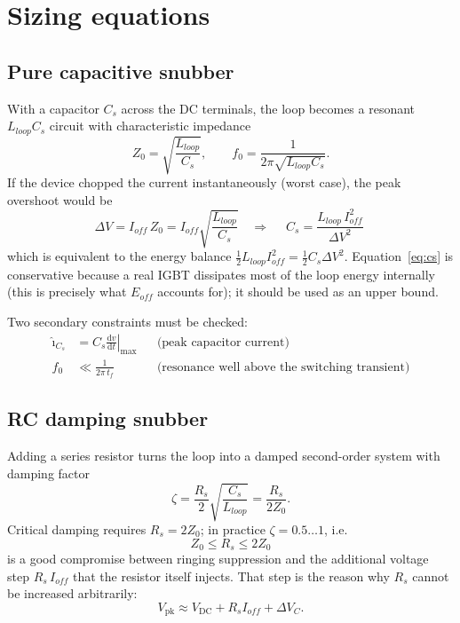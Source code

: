 \documentclass[11pt,a4paper]{article}
\newcommand{\Vdc}{V_{\mathrm{DC}}}
\newcommand{\Vpk}{V_{\mathrm{pk}}}
\begin{document}
\section{Sizing equations}

\subsection{Pure capacitive snubber}

With a capacitor $C_s$ across the DC terminals, the loop becomes a resonant
$L_{loop}C_s$ circuit with characteristic impedance
\begin{equation}
Z_0 = \sqrt{\frac{L_{loop}}{C_s}}, \qquad
f_0 = \frac{1}{2\pi\sqrt{L_{loop}C_s}}.
\end{equation}
If the device chopped the current instantaneously (worst case), the peak
overshoot would be
\begin{equation}
\Delta V = I_{off}\,Z_0 = I_{off}\sqrt{\frac{L_{loop}}{C_s}}
\quad\Longrightarrow\quad
\boxed{\;C_s = \frac{L_{loop}\,I_{off}^{2}}{\Delta V^{2}}\;}
\label{eq:cs}
\end{equation}
which is equivalent to the energy balance
$\tfrac{1}{2}L_{loop}I_{off}^{2} = \tfrac{1}{2}C_s\Delta V^{2}$.
Equation~\eqref{eq:cs} is conservative because a real IGBT dissipates most of
the loop energy internally (this is precisely what $E_{off}$ accounts for);
it should be used as an upper bound.

Two secondary constraints must be checked:
\begin{align}
\hat\imath_{C_s} &= C_s \left.\frac{\mathrm{d}v}{\mathrm{d}t}\right|_{\max}
  && \text{(peak capacitor current)} \label{eq:icap}\\
f_0 &\ll \frac{1}{2\pi\,t_f}
  && \text{(resonance well above the switching transient)} \nonumber
\end{align}

\subsection{RC damping snubber}

Adding a series resistor turns the loop into a damped second-order system with
damping factor
\begin{equation}
\zeta = \frac{R_s}{2}\sqrt{\frac{C_s}{L_{loop}}} = \frac{R_s}{2 Z_0}.
\end{equation}
Critical damping requires $R_s = 2Z_0$; in practice
$\zeta = 0.5\ldots 1$, i.e.
\begin{equation}
\boxed{\;Z_0 \le R_s \le 2 Z_0\;}
\end{equation}
is a good compromise between ringing suppression and the additional voltage
step $R_s\,I_{off}$ that the resistor itself injects. That step is the reason
why $R_s$ cannot be increased arbitrarily:
\begin{equation}
\Vpk \approx \Vdc + R_s I_{off} + \Delta V_{C}.
\end{equation}
\end{document}
